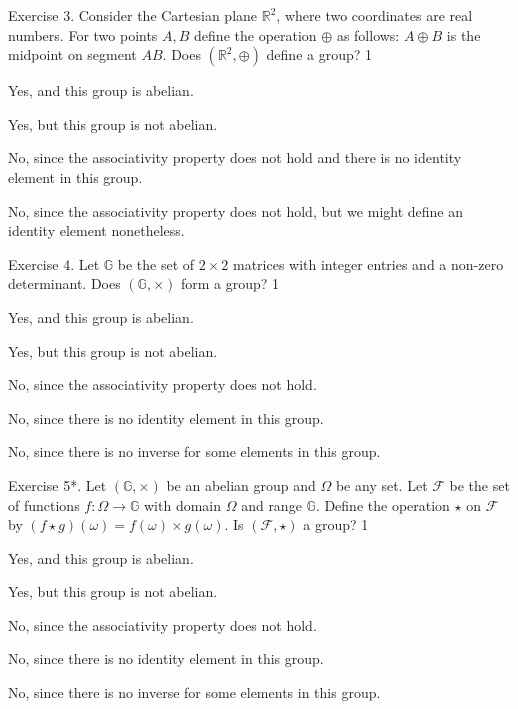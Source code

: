 \documentclass[../lecture-notes-148x210.tex]{subfiles}
\begin{document}
\begin{xexercise}
    {Exercise 3.}
    {Consider the Cartesian plane $\mathbb{R}^2$, where two coordinates are real numbers. For two points $A,B$ 
    define the operation $\oplus$ as follows: $A \oplus B$ is the midpoint on segment $AB$. Does 
    $(\mathbb{R}^2, \oplus)$ define a group?}
    {1}
    {
        \item Yes, and this group is abelian.
        \item Yes, but this group is not abelian.
        \item No, since the associativity property does not hold and there is no identity element in this group.
        \item No, since the associativity property does not hold, but we might define an identity element nonetheless.
    }
\end{xexercise}

\begin{xexercise}
    {Exercise 4.} {Let $\mathbb{G}$ be the set of $2\times 2$ matrices with integer 
    entries and a non-zero determinant. Does $(\mathbb{G},\times)$ form a group?} {1} {
        \item Yes, and this group is abelian.
        \item Yes, but this group is not abelian.
        \item No, since the associativity property does not hold.
        \item No, since there is no identity element in this group.
        \item No, since there is no inverse for some elements in this group.
    }
\end{xexercise}

\begin{xexercise}
    {Exercise 5*.} {Let $(\mathbb{G},\times)$ be an abelian group and $\Omega$
    be any set. Let $\mathcal{F}$ be the set of functions $f: \Omega \to
    \mathbb{G}$ with domain $\Omega$ and range $\mathbb{G}$. Define the
    operation $\star$ on $\mathcal{F}$ by $(f \star g)(\omega) = f(\omega)\times
    g(\omega)$. Is $(\mathcal{F}, \star)$ a group?} {1} {
        \item Yes, and this group is abelian.
        \item Yes, but this group is not abelian.
        \item No, since the associativity property does not hold.
        \item No, since there is no identity element in this group.
        \item No, since there is no inverse for some elements in this group.
    }
\end{xexercise}
\end{document}
